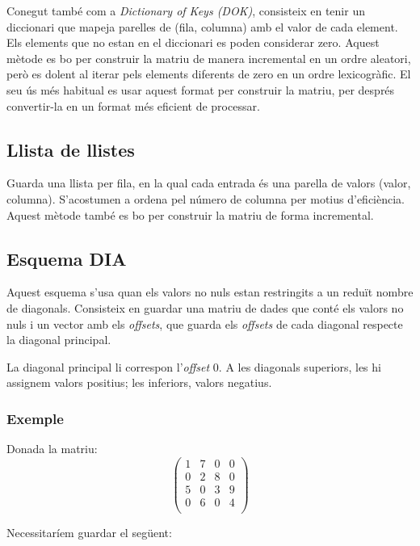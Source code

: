\documentclass[11pt,a4paper,twoside]{report}
\begin{document}
	 Conegut també com a \textit{Dictionary of Keys (DOK)}, consisteix en tenir un diccionari que mapeja parelles de (fila, columna) amb el valor de cada element. Els elements que no estan en el diccionari es poden considerar zero. Aquest mètode es bo per construir la matriu de manera incremental en un ordre aleatori, però es dolent al iterar pels elements diferents de zero en un ordre lexicogràfic. El seu ús més habitual es usar aquest format per construir la matriu, per després convertir-la en un format més eficient de processar.
	 
	 \subsection{Llista de llistes}
  
  Guarda una llista per fila, en la qual cada entrada és una parella de valors (valor, columna). S'acostumen a ordena pel número de columna per motius d'eficiència. Aquest mètode també es bo per construir la matriu de forma incremental.
  
  \subsection{Esquema DIA}
  
  Aquest esquema s'usa quan els valors no nuls estan restringits a un reduït nombre de diagonals. Consisteix en guardar una matriu de dades que conté els valors no nuls i un vector amb els \textit{offsets}, que guarda els \textit{offsets} de cada diagonal respecte la diagonal principal.
  
  La diagonal principal li correspon l'\textit{offset} 0. A les diagonals superiors, les hi assignem valors positius; les inferiors, valors negatius.
  
  \subsubsection*{Exemple}
	
	Donada la matriu:
	 \[
	 	\begin{pmatrix}
  		  	1	&	7	& 0	&	0	\\
  		  	0	&	2	&	8	&	0	\\
   		 	5	&	0	&	3	&	9	\\
    		0	&	6	&	0	&	4	\\
    \end{pmatrix} \]
    
    Necessitaríem guardar el següent:
     
\end{document}
